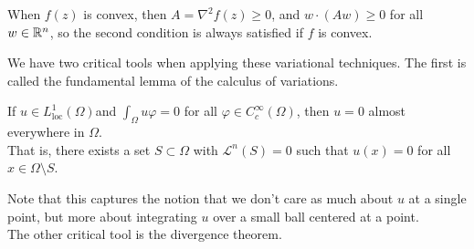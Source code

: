 \documentclass{memoir}
\begin{document}

\begin{rmrk}
	When \(f(z)\) is convex, then \(A= \nabla^2f(z) \geq 0\), and \(w\cdot (Aw) \geq 0\) for all \(w \in \mathbb{R}^{n}\), so the second condition is always satisfied if \(f \) is convex.
\end{rmrk}

We have two critical tools when applying these variational techniques. The first is called the fundamental lemma of the calculus of variations.

\begin{lemma}
	If \(u \in L^{1}_{\textrm{loc}}(\Omega )\)\footnotemark 	and \(\int_\Omega u\varphi =0\) for all \(\varphi  \in C^{\infty}_c(\Omega )\), then \(u = 0\) almost everywhere in \(\Omega \).\\

	That is, there exists a set \(S\subset \Omega \) with \(\mathcal{L}^{n}(S) = 0\) such that \(u(x) = 0 \) for all \(x \in \Omega \setminus S\).
\end{lemma}

Note that this captures the notion that we don't care as much about \(u\) at a single point, but more about integrating \(u\) over a small ball centered at a point.\\

The other critical tool is the divergence theorem.
\end{document}

